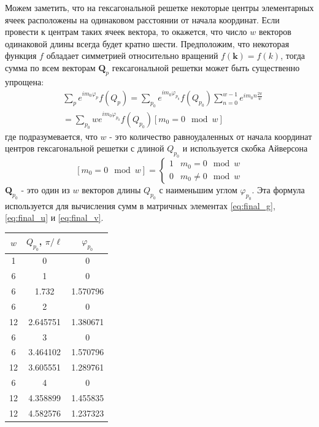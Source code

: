 \documentclass[a4paper,article,14pt]{extarticle}
\begin{document}
Можем заметить, что на гексагональной решетке некоторые центры элементарных ячеек расположены на одинаковом расстоянии от начала координат. Если провести к центрам таких ячеек вектора, то окажется, что число $w$ векторов одинаковой длины всегда будет кратно шести. Предположим, что некоторая функция $f$ обладает симметрией относительно вращений $f(\mathbf{k})=f(k)$, тогда сумма по всем векторам $\mathbf{Q}_p$ гексагональной решетки может быть существенно упрощена:
\begin{equation}
\label{eq:sum_qp}
\begin{aligned}
&\sum\limits_{p} e^{i m_0\varphi_p}   f(Q_p)  = \sum\limits_{p_0} e^{im_0\varphi_{{p_0}}} f(Q_{p_0})   \sum\limits_{n=0}^{w-1} e^{i m_0 n \frac{2 \pi}{w}} \\
  &=\sum\limits_{p_0} w e^{i m_0\varphi_{p_0}} f(Q_{p_0}) \left[m_0 = 0 \mod w  \right] 
\end{aligned}
\end{equation}
где подразумевается, что $w$ - это количество равноудаленных от начала координат центров гексагональной решетки с длиной $Q_{p_0}$ и используется скобка Айверсона
$$
\left[m_0 = 0 \mod w  \right] =   
\begin{cases}
   1 & m_0 = 0 \mod w \\
   0 & m_0 \neq 0 \mod w 
 \end{cases}
$$
$\mathbf{Q}_{p_0}$ - это один из $w$ векторов длины $Q_{p_0}$ с наименьшим углом $\varphi_{p_0}$.
Эта формула используется для вычисления сумм в матричных элементах \eqref{eq:final_g}, \eqref{eq:final_u} и \eqref{eq:final_v}.

\begin{center}
\begin{tabular}{ |c|c|c| }
 \hline
 $w$  & $Q_{p_0}$, $\pi / \ell$ & $\varphi_{p_0}$\\ 
 \hline
 1&0&0\\
 6&1&0\\
 6&1.732&1.570796\\
 6&2&0\\
 12&2.645751&1.380671\\
 6&3&0\\
 6&3.464102&1.570796\\
 12&3.605551&1.289761\\
 6&4&0\\
 12&4.358899&1.455835\\
 12&4.582576&1.237323\\
 \hline
\end{tabular}
\end{center}
\end{document}
